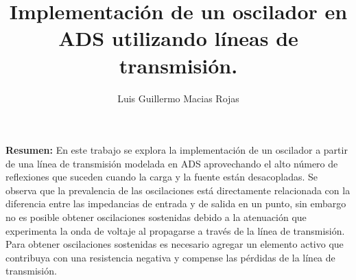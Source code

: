 \documentclass{article}   %
\title{Implementación de un oscilador en ADS utilizando líneas de transmisión.}
\author{Luis Guillermo Macias Rojas}
\theoremstyle{mytheoremstyle}
\theoremstyle{mytheoremstyle}
\theoremstyle{myproblemstyle}
\begin{document}
    \maketitle

    \selectfont %
    \noindent
    \textbf{Resumen:} En este trabajo se explora la implementación de un oscilador a partir de una línea de transmisión modelada
    en ADS aprovechando el alto número de reflexiones que suceden cuando la carga y la fuente están desacopladas. Se observa que la
    prevalencia de las oscilaciones está directamente relacionada con la diferencia entre las impedancias de entrada y de salida en un
    punto, sin embargo no es posible obtener oscilaciones sostenidas debido a la atenuación que experimenta la onda de voltaje 
    al propagarse a través de la línea de transmisión. Para obtener oscilaciones sostenidas es necesario agregar un elemento
    activo que contribuya con una resistencia negativa y compense las pérdidas de la línea de transmisión.
\end{document}
